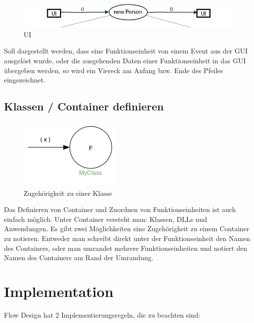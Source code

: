 \begin{figure}[H]
	\centering
		\includegraphics[width=.9\linewidth]{./img/diagramUI.png}
	\caption{UI}
\end{figure}


Soll dargestellt werden, dass eine Funktionseinheit von einem Event aus der GUI ausgelöst
wurde, oder die ausgehenden Daten einer Funktionseinheit in das GUI übergeben werden, so
wird ein Viereck am Anfang bzw. Ende des Pfeiles eingezeichnet.

\section{Klassen / Container definieren}


\begin{figure}[H]
	\centering
	\includegraphics[width=.4\linewidth]{./img/diagramClass.png}
	\caption{Zugehörigkeit zu einer Klasse}
\end{figure}


Das Definieren von Container und Zuordnen von Funktionseinheiten ist auch
einfach möglich. Unter Container versteht man: Klassen, DLLs und Anwendungen.
Es gibt zwei Möglichkeiten eine Zugehörigkeit zu einem Container zu notieren.
Entweder man schreibt direkt unter der Funktionseinheit den Namen des
Containers, oder man umrandet mehrere Funktionseinheiten und notiert den Namen
des Containers am Rand der Umrandung.



\chapter{Implementation}


Flow Design hat 2 Implementierungsregeln, die zu beachten sind:


